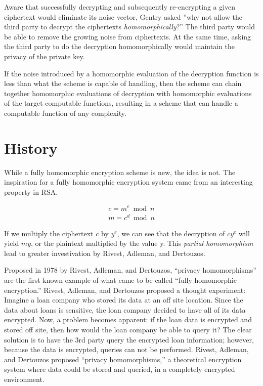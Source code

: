 \documentclass[a4paper,10pt]{article}
\begin{document}
Aware that successfully decrypting and subsequently re-encrypting a
given ciphertext would eliminate its noise vector, Gentry asked ''why
not allow the third party to decrypt the ciphertexts \textit{homomorphically}?''
The third party would be able to remove the growing noise from
ciphertexts. At the same time, asking the third party to do the
decryption homomorphically would maintain the privacy of the private
key.

If the noise introduced by a homomorphic evaluation of the decryption
function is less than what the scheme is capable of handling, then the
scheme can chain together homomorphic evaluations of decryption with
homomorphic evaluations of the target computable functions, resulting
in a scheme that can handle a computable function of any complexity.

\section{History}
While a fully homomorphic encryption scheme is new, the idea is
not. The inspiration for a fully homomorphic encryption system came
from an interesting property in RSA.

\begin{eqnarray*}
c = m ^{e} \bmod n\\
m = c ^{d} \bmod n 
\end{eqnarray*}

If we multiply the ciphertext $c$ by $y ^{e}$, we can see that the
decryption of $ cy^{e} $ will yield $my$, or the plaintext multiplied
by the value y. This \textit{partial homomorphism} lead to greater
investivation by Rivest, Adleman, and Dertouzos.

Proposed in 1978 by Rivest, Adleman, and Dertouzos, ``privacy
homomorphisms'' are the first known example of what came to be called
``fully homomorphic encryption.'' Rivest, Adleman, and Dertouzos
proposed a thought experiment: Imagine a loan company who stored its
data at an off site location. Since the data about loans is sensitive,
the loan company decided to have all of its data encrypted. Now, a
problem becomes apparent: if the loan data is encrypted and stored off
site, then how would the loan company be able to query it? The clear
solution is to have the 3rd party query the encrypted loan
information; however, because the data is encrypted, queries can not
be performed. Rivest, Adleman, and Dertouzos proposed ``privacy
homomorphisms,'' a theoretical encryption system where data could be
stored and queried, in a completely encrypted environment.
\end{document}
